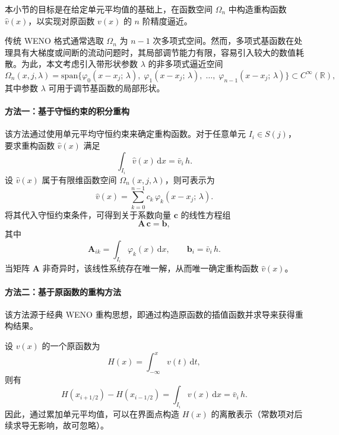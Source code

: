 \documentclass[12pt,a4paper]{article}
\numberwithin{equation}{section}    %
\begin{document}
本小节的目标是在给定单元平均值的基础上，在函数空间 $\Omega_n$ 中构造重构函数 $\hat{v}(x)$，以实现对原函数 $v(x)$ 的 $n$ 阶精度逼近。

传统 WENO 格式通常选取 $\Omega_n$ 为 $n-1$ 次多项式空间。然而，多项式基函数在处理具有大梯度或间断的流动问题时，其局部调节能力有限，容易引入较大的数值耗散。为此，本文考虑引入带形状参数 $\lambda$ 的非多项式逼近空间
\begin{equation}
    \Omega_n(x, j, \lambda)
    = \mathrm{span}\bigl\{
    \varphi_0(x - x_j;\, \lambda),\;
    \varphi_1(x - x_j;\, \lambda),\;
    \ldots,\;
    \varphi_{n-1}(x - x_j;\, \lambda)
    \bigr\} \subset C^\infty(\mathbb{R}),
\end{equation}
其中参数 $\lambda$ 可用于调节基函数的局部形状。

\paragraph{方法一：基于守恒约束的积分重构}

该方法通过使用单元平均守恒约束来确定重构函数。对于任意单元 $I_i \in S(j)$，要求重构函数 $\hat{v}(x)$ 满足
\begin{equation}
    \int_{I_i} \hat{v}(x)\,\mathrm{d}x = \bar{v}_i\,h.
\end{equation}
设 $\hat{v}(x)$ 属于有限维函数空间 $\Omega_n(x, j, \lambda)$，则可表示为
\begin{equation}
    \hat{v}(x) = \sum_{k=0}^{n-1} c_k\,\varphi_k(x - x_j;\, \lambda).
\end{equation}
将其代入守恒约束条件，可得到关于系数向量 $\bm{c}$ 的线性方程组
\begin{equation}
    \bm{A}\,\bm{c} = \bm{b},
\end{equation}
其中
\begin{equation}
    \bm{A}_{ik} = \int_{I_i} \varphi_k(x)\,\mathrm{d}x, \qquad
    \bm{b}_i = \bar{v}_i\,h.
\end{equation}
当矩阵 $\bm{A}$ 非奇异时，该线性系统存在唯一解，从而唯一确定重构函数 $\hat{v}(x)$。

\paragraph{方法二：基于原函数的重构方法}

该方法源于经典 WENO 重构思想，即通过构造原函数的插值函数并求导来获得重构结果。

设 $v(x)$ 的一个原函数为
\begin{equation}
    H(x) = \int_{-\infty}^{x} v(t)\,\mathrm{d}t,
\end{equation}
则有
\begin{equation}
    H(x_{i+1/2}) - H(x_{i-1/2}) = \int_{I_i} v(x)\,\mathrm{d}x = \bar{v}_i\,h.
\end{equation}
因此，通过累加单元平均值，可以在界面点构造 $H(x)$ 的离散表示（常数项对后续求导无影响，故可忽略）。
\end{document}

